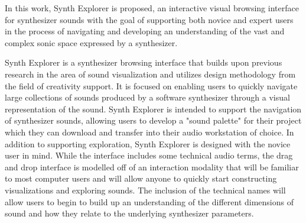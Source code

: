 
In this work, Synth Explorer is proposed, an interactive visual browsing interface for synthesizer sounds with the goal of supporting both novice and expert users in the process of navigating and developing an understanding of the vast and complex sonic space expressed by a synthesizer.

Synth Explorer is a synthesizer browsing interface that builds upon previous research in the area of sound visualization and utilizes design methodology from the field of creativity support. It is focused on enabling users to quickly navigate large collections of sounds produced by a software synthesizer through a visual representation of the sound. Synth Explorer is intended to support the navigation of synthesizer sounds, allowing users to develop a "sound palette" for their project which they can download and transfer into their audio workstation of choice. In addition to supporting exploration, Synth Explorer is designed with the novice user in mind. While the interface includes some technical audio terms, the drag and drop interface is modelled off of an interaction modality that will be familiar to most computer users and will allow anyone to quickly start constructing visualizations and exploring sounds. The inclusion of the technical names will allow users to begin to build up an understanding of the different dimensions of sound and how they relate to the underlying synthesizer parameters. 

